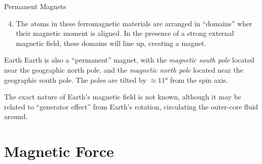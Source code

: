 \documentclass[12pt,aspectratio=169]{beamer}
\begin{document}
\begin{frame}{Permanent Magnets}
  \begin{enumerate}
    \setcounter{enumi}{3}
  \item The atoms in these ferromagnetic materials are arranged in ``domains''
    wher their magnetic moment is aligned. In the presence of a strong
    external magnetic field, these domains will line up, creating a magnet.
    \begin{center}
    \end{center}
  \end{enumerate}
\end{frame}


    
\begin{frame}{Earth}
  Earth is also a ``permanent'' magnet, with the \emph{magnetic south pole}
  located near the geographic north pole, and the \emph{magnetic north pole}
  located near the geographic south pole. The poles are tilted by
  $\approx\ang{11}$ from the spin axis.
  \begin{center}
  \end{center}
  The exact nature of Earth's magnetic field is not known, although it may be
  related to ``generator effect'' from Earth's rotation, circulating the
  outer-core fluid around.
\end{frame}


\section{Magnetic Force}
\end{document}
